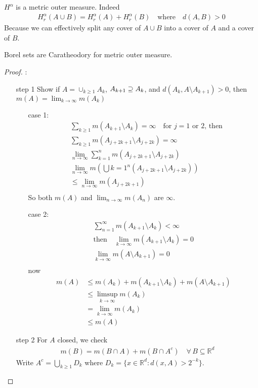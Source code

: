 \begin{example}
	$H^{\alpha}$ is a metric outer measure. Indeed
	\begin{align*}
	H_{r}^{\alpha}(A \cup B) = H_{r}^{\alpha}(A) + H_{r}^{\alpha}(B)  \quad \text{where} \quad d(A,B) > 0
	\end{align*} 
	Because we can effectively split any cover of $A \cup B$ into a cover of $A$ and a cover of $B$.
\end{example}

\begin{lemma}
	Borel sets are Caratheodory for metric outer measure.
\end{lemma}

\begin{proof}:
	\begin{enumerate}
		\item[step 1] Show if $A = \cup_{k \geq 1} A_k$, $A_{k+1} \supseteq A_k$,
			and $d(A_k, A \setminus A_{k+1}) >0$, then $m(A) = \lim_{k \to \infty} m(A_k)$ 
			\begin{enumerate}
				\item[case 1:] 
					\begin{align*}
					&\sum_{k \geq 1} m(A_{k+1} \setminus A_k) = \infty \quad \text{for $j=1$ or $2$, then}\\
					&\sum_{k \geq 1} m(A_{j+2k+1} \setminus A_{j + 2k})  = \infty \\
					&\lim_{n \to \infty} \sum_{k = 1}^{n} m(A_{j+2k+1} \setminus A_{j + 2k}) \\
					&\lim_{n \to \infty} m(\bigcup{k = 1}^{n} (A_{j+2k+1} \setminus A_{j + 2k})) \\
					&\leq \lim_{n \to \infty} m(A_{j+2k+1} ) \\
					\end{align*} 
					So both $m(A)$ and $\lim_{n \to \infty} m(A_n)$ are $\infty$.

				\item[case 2:]
					\begin{align*}
						\sum_{n=1}^{\infty} m(A_{k+1} \setminus A_{k}) < \infty \\
					\text{then} \quad \lim_{k \to \infty}  m(A_{k+1} \setminus A_{k}) = 0\\
					\lim_{k \to \infty}  m(A \setminus A_{k+1}) = 0\\
					\end{align*} now
					\begin{align*}
						m(A) &\leq m(A_{k}) + m(A_{k+1} \setminus A_{k}) + m(A \setminus A_{k+1}) \\
							 &\leq \limsup_{k \to \infty} m(A_{k}) \\
							 &= \lim_{k \to \infty} m(A_{k}) \\
							 &\leq m(A)
					\end{align*} 
			\end{enumerate}
		\item[step 2] For $A$ closed, we check 
			\begin{align*}
			m(B) = m(B \cap A) + m(B \cap A^{c}) \quad \forall \, B \subseteq \mathbb{R}^d
			\end{align*} 
			Write $A^{c} = \bigcup_{k \geq 1} D_k$ where $D_{k} = \{x \in \mathbb{R}^d : d(x,A) > 2^{-k} \}$.


\end{enumerate}
\end{proof}
